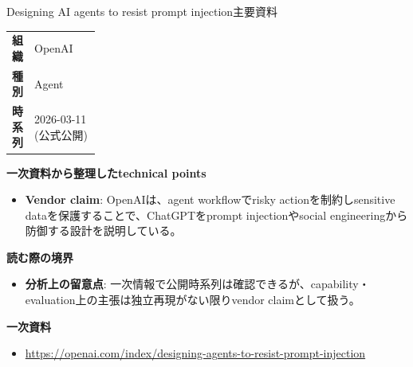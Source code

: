 \begin{technicalnote}{Designing AI agents to resist prompt injection}{主要資料}
\begingroup
\begin{tabularx}{\linewidth}{@{}>{\bfseries}p{0.22\linewidth}X@{}}
組織 & OpenAI \\
種別 & Agent \\
時系列 & 2026-03-11 (公式公開) \\
\end{tabularx}
\smallskip
{\bfseries 一次資料から整理したtechnical points}
\begin{itemize}[leftmargin=1.5em,itemsep=0.35em]
\item \textbf{Vendor claim}: OpenAIは、agent workflowでrisky actionを制約しsensitive dataを保護することで、ChatGPTをprompt injectionやsocial engineeringから防御する設計を説明している。
\end{itemize}
\begin{minipage}{\linewidth}
{\bfseries 読む際の境界}
\begin{itemize}[leftmargin=1.5em,itemsep=0.35em]
\item \textbf{分析上の留意点}: 一次情報で公開時系列は確認できるが、capability・evaluation上の主張は独立再現がない限りvendor claimとして扱う。
\end{itemize}
\begin{samepage}
{\bfseries 一次資料}
\begingroup\sloppy
\begin{itemize}[leftmargin=1.5em,itemsep=0.25em]
\item {\scriptsize\url{https://openai.com/index/designing-agents-to-resist-prompt-injection}}
\end{itemize}
\endgroup
\end{samepage}
\end{minipage}
\endgroup
\end{technicalnote}
\medskip

